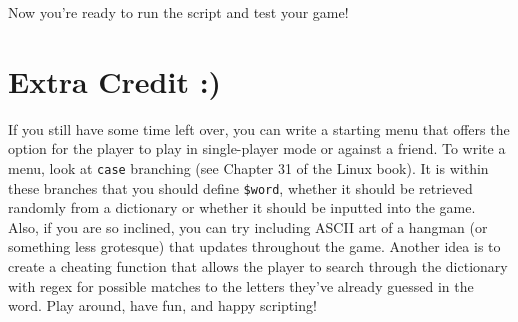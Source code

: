 \documentclass{article}
\begin{document}
Now you're ready to run the script and test your game!



\section*{Extra Credit :)}

\indent\indent If you still have some time left over, you can write a starting menu that offers the option for the player to play in single-player mode or against a friend. To write a menu, look at \verb|case| branching (see Chapter 31 of the Linux book). It is within these branches that you should define \verb|$word|, whether it should be retrieved randomly from a dictionary or whether it should be inputted into the game. \\

Also, if you are so inclined, you can try including ASCII art of a hangman (or something less grotesque) that updates throughout the game. Another idea is to create a cheating function that allows the player to search through the dictionary with regex for possible matches to the letters they've already guessed in the word. Play around, have fun, and happy scripting!
\end{document}
